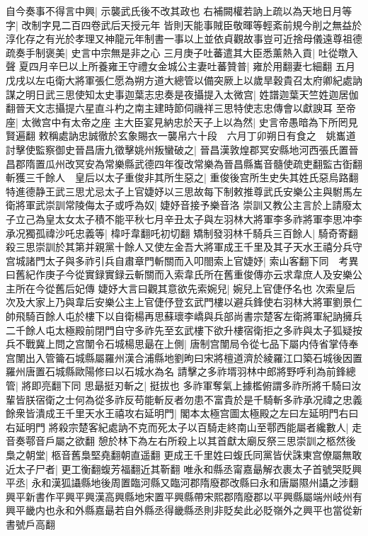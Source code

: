 自今奏事不得言中興|{
	示襲武氏後不改其政也}
右補闕權若訥上疏以為天地日月等字|{
	改制字見二百四卷武后天授元年}
皆則天能事賊臣敬暉等輕紊前規今削之無益於淳化存之有光於孝理又神龍元年制書一事以上並依貞觀故事豈可近捨母儀遠尊祖德疏奏手制褒美|{
	史言中宗無是非之心}
三月庚子吐蕃遣其大臣悉薰熱入貢|{
	吐從暾入聲}
夏四月辛巳以上所養雍王守禮女金城公主妻吐蕃贊普|{
	雍於用翻妻七細翻}
五月戊戌以左屯衛大將軍張仁愿為朔方道大總管以備突厥上以歲旱穀貴召太府卿紀處訥謀之明日武三思使知太史事迦葉志忠奏是夜攝提入太微宫|{
	姓譜迦葉天竺姓迦居伽翻晉天文志攝提六星直斗杓之南主建時節伺禨祥三思特使志忠傳會以獻諛耳}
至帝座|{
	太微宫中有太帝之座}
主大臣宴見納忠於天子上以為然|{
	史言帝愚暗為下所罔見賢遍翻}
敕稱處訥忠誠徹於玄象賜衣一襲帛六十段　六月丁卯朔日有食之　姚巂道討擊使監察御史晉昌唐九徵擊姚州叛蠻破之|{
	晉昌漢敦煌郡冥安縣地河西張氏置晉昌郡隋置瓜州改冥安為常樂縣武德四年復改常樂為晉昌縣巂音髓使疏吏翻監古衘翻}
斬獲三千餘人　皇后以太子重俊非其所生惡之|{
	重俊後宫所生史失其姓氏惡烏路翻}
特進德静王武三思尤忌太子上官婕妤以三思故每下制敕推尊武氏安樂公主與駙馬左衛將軍武崇訓常陵侮太子或呼為奴|{
	婕妤音接予樂音洛}
崇訓又教公主言於上請廢太子立己為皇太女太子積不能平秋七月辛丑太子與左羽林大將軍李多祚將軍李思冲李承况獨孤禕沙吒忠義等|{
	椲吁韋翻吒初切翻}
矯制發羽林千騎兵三百餘人|{
	騎奇寄翻}
殺三思崇訓於其第并親黨十餘人又使左金吾大將軍成王千里及其子天水王禧分兵守宫城諸門太子與多祚引兵自肅章門斬關而入叩閤索上官婕妤|{
	索山客翻下同　考異曰舊紀作庚子今從實録實録云斬關而入索韋氏所在舊重俊傳亦云求韋庶人及安樂公主所在今從舊后妃傳}
婕妤大言曰觀其意欲先索婉兒|{
	婉兒上官倢伃名也}
次索皇后次及大家上乃與韋后安樂公主上官倢伃登玄武門樓以避兵鋒使右羽林大將軍劉景仁帥飛騎百餘人屯於樓下以自衛楊再思蘇瓌李嶠與兵部尚書宗楚客左衛將軍紀訥擁兵二千餘人屯太極殿前閉門自守多祚先至玄武樓下欲升樓宿衛拒之多祚與太子狐疑按兵不戰冀上問之宫闈令石城楊思朂在上側|{
	唐制宫闈局令從七品下屬内侍省掌侍奉宫闈出入管籥石城縣屬羅州漢合浦縣地劉昫曰宋將檀道濟於綾羅江口築石城後因置羅州唐置石城縣歐陽修曰以石城水為名}
請擊之多祚壻羽林中郎將野呼利為前鋒總管|{
	將即亮翻下同}
思朂挺刃斬之|{
	挺拔也}
多祚軍奪氣上據檻俯謂多祚所將千騎曰汝輩皆朕宿衛之士何為從多祚反苟能斬反者勿患不富貴於是千騎斬多祚承况禕之忠義餘衆皆潰成王千里天水王禧攻右延明門|{
	閣本太極宫圖太極殿之左曰左延明門右曰右延明門}
將殺宗楚客紀處訥不克而死太子以百騎走終南山至鄠西能屬者纔數人|{
	走音奏鄠音戶屬之欲翻}
憩於林下為左右所殺上以其首獻太廟反祭三思崇訓之柩然後梟之朝堂|{
	柩音舊梟堅堯翻朝直遥翻}
更成王千里姓曰蝮氏同黨皆伏誅東宫僚屬無敢近太子尸者|{
	更工衡翻蝮芳福翻近其靳翻}
唯永和縣丞甯嘉朂解衣裹太子首號哭貶興平丞|{
	永和漢狐讘縣地後周置臨河縣又臨河郡隋廢郡改縣曰永和唐屬隰州讘之涉翻興平新書作平興平興漢高興縣地宋置平興縣帶宋熙郡隋廢郡以平興縣屬端州岐州有興平畿内也永和外縣嘉朂若自外縣丞得畿縣丞則非貶矣此必貶嶺外之興平也當從新書號戶高翻}
